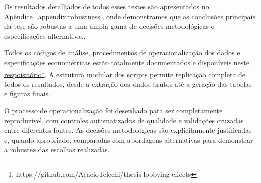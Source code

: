 Os resultados detalhados de todos esses testes são apresentados no Apêndice~\ref{appendix:robustness}, onde demonstramos que as conclusões principais da tese são robustas a uma ampla gama de decisões metodológicas e especificações alternativas.

Todos os códigos de análise, procedimentos de operacionalização dos dados e especificações econométricas estão totalmente documentados e disponíveis \href{https://github.com/AcacioTelechi/thesis-lobbying-effects}{neste respoisitório}\footnote{https://github.com/AcacioTelechi/thesis-lobbying-effects}. A estrutura modular dos scripts permite replicação completa de todos os resultados, desde a extração dos dados brutos até a geração das tabelas e figuras finais.

O processo de operacionalização foi desenhado para ser completamente reproduzível, com controles automatizados de qualidade e validações cruzadas entre diferentes fontes. As decisões metodológicas são explicitamente justificadas e, quando apropriado, comparadas com abordagens alternativas para demonstrar a robustez das escolhas realizadas.
